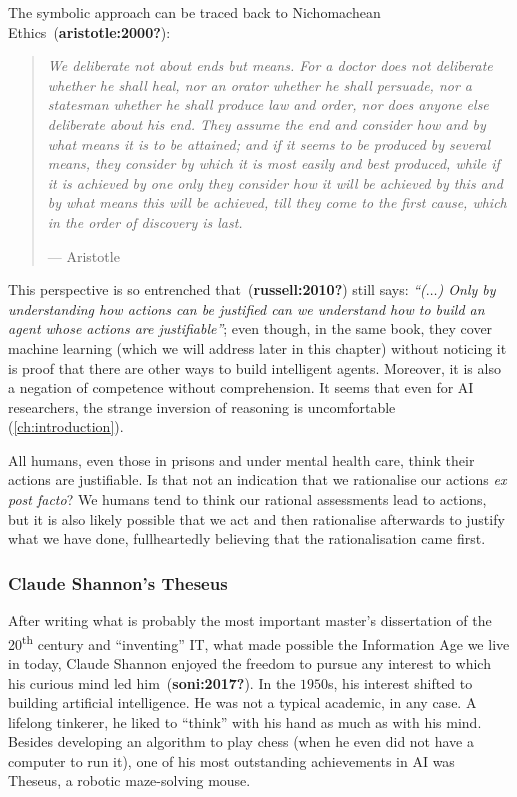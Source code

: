 \documentclass[
  letterpaper,
  DIV=11,
  numbers=noendperiod,
  oneside]{scrreprt}
\begin{document}
The symbolic approach can be traced back to Nichomachean
Ethics~(\textbf{aristotle:2000?}):

\begin{quote}
\emph{We deliberate not about ends but means. For a doctor does not
deliberate whether he shall heal, nor an orator whether he shall
persuade, nor a statesman whether he shall produce law and order, nor
does anyone else deliberate about his end. They assume the end and
consider how and by what means it is to be attained; and if it seems to
be produced by several means, they consider by which it is most easily
and best produced, while if it is achieved by one only they consider how
it will be achieved by this and by what means this will be achieved,
till they come to the first cause, which in the order of discovery is
last.}

--- Aristotle~
\end{quote}

This perspective is so entrenched that~(\textbf{russell:2010?}) still
says: \emph{``(\(\ldots\)) Only by understanding how actions can be
justified can we understand how to build an agent whose actions are
justifiable''}; even though, in the same book, they cover machine
learning (which we will address later in this chapter) without noticing
it is proof that there are other ways to build intelligent agents.
Moreover, it is also a negation of competence without comprehension. It
seems that even for AI researchers, the strange inversion of reasoning
is uncomfortable
(\protect\hyperlink{ch:introduction}{{[}ch:introduction{]}}).

All humans, even those in prisons and under mental health care, think
their actions are justifiable. Is that not an indication that we
rationalise our actions \emph{ex post facto}? We humans tend to think
our rational assessments lead to actions, but it is also likely possible
that we act and then rationalise afterwards to justify what we have
done, fullheartedly believing that the rationalisation came first.

\hypertarget{claude-shannons-theseus}{%
\subsubsection{Claude Shannon's Theseus}\label{claude-shannons-theseus}}

After writing what is probably the most important master's dissertation
of the 20\textsuperscript{th} century and ``inventing'' {IT}, what made
possible the Information Age we live in today, Claude Shannon enjoyed
the freedom to pursue any interest to which his curious mind led
him~(\textbf{soni:2017?}). In the \(1950\)s, his interest shifted to
building artificial intelligence. He was not a typical academic, in any
case. A lifelong tinkerer, he liked to ``think'' with his hand as much
as with his mind. Besides developing an algorithm to play chess (when he
even did not have a computer to run it), one of his most outstanding
achievements in AI was Theseus, a robotic maze-solving mouse.
\end{document}
